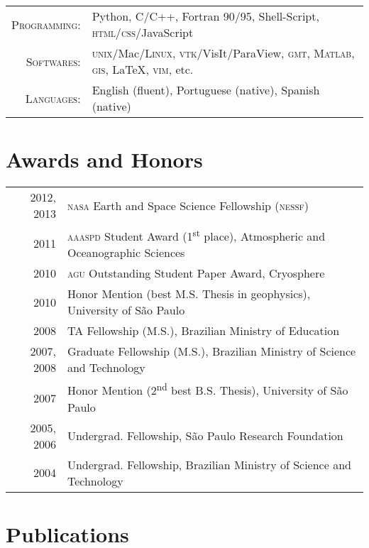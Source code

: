 \documentclass[a4paper,11pt]{article}
\begin{document}
\begin{tabular}{rl}
\textsc{Programming:} & Python, C/C++, Fortran 90/95, Shell-Script, \textsc{html}/\textsc{css}/JavaScript\\
\textsc{Softwares:} & \textsc{unix}/Mac/\textsc{Linux}, \textsc{vtk}/VisIt/ParaView, \textsc{gmt}, \textsc{Matlab}, \textsc{gis}, \LaTeX, \textsc{vim}, etc.\\
\textsc{Languages:} & English (fluent), Portuguese (native), Spanish (native)
\end{tabular}


\section{Awards and Honors}

\begin{tabular}{rl}
2012, 2013 & \textsc{nasa} Earth and Space Science Fellowship (\textsc{nessf})\\ 
2011 & \textsc{aaaspd} Student Award (1\textsuperscript{st} place), Atmospheric and Oceanographic Sciences\\
2010 & \textsc{agu} Outstanding Student Paper Award, Cryosphere\\
2010 & Honor Mention (best M.S. Thesis in geophysics), University of S\~ao Paulo\\
2008 & TA Fellowship (M.S.), Brazilian Ministry of Education\\
2007, 2008 & Graduate Fellowship (M.S.), Brazilian Ministry of Science and Technology\\
2007 & Honor Mention (2\textsuperscript{nd} best B.S. Thesis), University of S\~ao Paulo\\
2005, 2006 & Undergrad. Fellowship, S\~ao Paulo Research Foundation\\
2004 & Undergrad. Fellowship, Brazilian Ministry of Science and Technology
\end{tabular}


\section{Publications}
\end{document}
